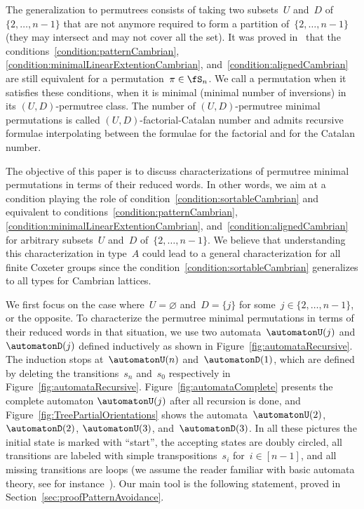 The generalization to permutrees consists of taking two subsets~$U$ and~$D$ of~$\{2, \dots, n-1\}$ that are not anymore required to form a partition of~$\{2, \dots, n-1\}$ (they may intersect and may not cover all the set).
It was proved in~\cite{PilaudPons-permutrees, ChatelPilaudPons} that the conditions~\ref{condition:patternCambrian}, \ref{condition:minimalLinearExtentionCambrian}, and~\ref{condition:alignedCambrian} are still equivalent for a permutation~$\pi \in \fS_n$.
We call a permutation  when it satisfies these conditions, \ie when it is minimal (minimal number of inversions) in its $(U,D)$-permutree class.
The number of $(U,D)$-permutree minimal permutations is called $(U,D)$-factorial-Catalan number and admits recursive formulae interpolating between the formulae for the factorial and for the Catalan number.

The objective of this paper is to discuss characterizations of permutree minimal permutations in terms of their reduced words.
In other words, we aim at a condition playing the role of condition~\ref{condition:sortableCambrian} and equivalent to conditions~\ref{condition:patternCambrian}, \ref{condition:minimalLinearExtentionCambrian}, and~\ref{condition:alignedCambrian} for arbitrary subsets~$U$ and~$D$ of~$\{2, \dots, n-1\}$.
We believe that understanding this characterization in type~$A$ could lead to a general characterization for all finite Coxeter groups since the condition~\ref{condition:sortableCambrian} generalizes to all types for Cambrian lattices.

We first focus on the case where~$U = \varnothing$ and~$D = \{j\}$ for some~${j \in \{2, \dots, n-1\}}$, or the opposite.
To characterize the permutree minimal permutations in terms of their reduced words in that situation, we use two automata~$\automatonU(j)$ and $\automatonD(j)$ defined inductively as shown in Figure~\ref{fig:automataRecursive}.
The induction stops at~$\automatonU(n)$ and~$\automatonD(1)$, which are defined by deleting the transitions~$s_n$ and~$s_0$ respectively in Figure~\ref{fig:automataRecursive}.
Figure~\ref{fig:automataComplete} presents the complete automaton $\automatonU(j)$ after all recursion is done, and Figure~\ref{fig:TreePartialOrientations} shows the automata~$\automatonU(2)$, $\automatonD(2)$, $\automatonU(3)$, and~$\automatonD(3)$.
In all these pictures the initial state is marked with ``start'', the accepting states are doubly circled, all transitions are labeled with simple transpositions~$s_i$ for~$i \in [n-1]$, and all missing transitions are loops (we assume the reader familiar with basic automata theory, see for instance~\cite{HopcroftUllman}).
Our main tool is the following statement, proved in Section~\ref{sec:proofPatternAvoidance}.

